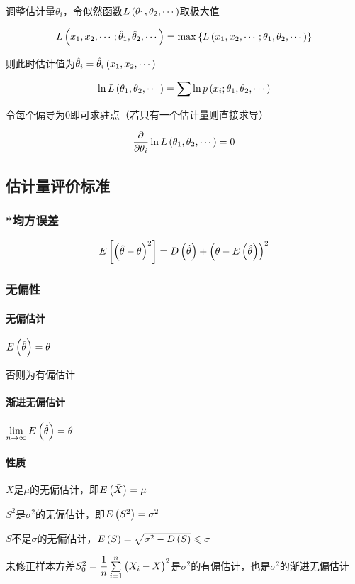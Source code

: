 \documentclass{article}
\begin{document}
调整估计量$\theta_i$，令似然函数$L\left(\theta_1,\theta_2,\cdots\right)$取极大值

\[L\left(x_1,x_2,\cdots;\hat\theta_1,\hat\theta_2,\cdots\right)=\max\left\{L\left(x_1,x_2,\cdots;\theta_1,\theta_2,\cdots\right)\right\}\]

则此时估计值为$\hat\theta_i=\hat\theta_i\left(x_1,x_2,\cdots\right)$

\[\ln L\left(\theta_1,\theta_2,\cdots\right)=\sum\ln p\left(x_i;\theta_1,\theta_2,\cdots\right)\]

令每个偏导为$0$即可求驻点（若只有一个估计量则直接求导）

\[\frac\partial{\partial\theta_i}\ln L\left(\theta_1,\theta_2,\cdots\right)=0\]

\subsection{估计量评价标准}

\subsubsection{*均方误差}

\[E\left[\left(\hat\theta-\theta\right)^2\right]=D\left(\hat\theta\right)+{\left(\theta-E\left(\hat\theta\right)\right)}^2\]

\subsubsection{无偏性}

\paragraph{无偏估计}$E\left(\hat\theta\right)=\theta$

否则为有偏估计

\paragraph{渐进无偏估计}$\lim\limits_{n\to\infty}E\left(\hat\theta\right)=\theta$

\paragraph{性质}

$\bar X$是$\mu$的无偏估计，即$E\left(\bar X\right)=\mu$

$S^2$是$\sigma^2$的无偏估计，即$E\left(S^2\right)=\sigma^2$

$S$不是$\sigma$的无偏估计，$E\left(S\right)=\sqrt{\sigma^2-D\left(S\right)}\leqslant\sigma$

未修正样本方差$S_0^2=\dfrac1n\sum\limits_{i=1}^n{\left(X_i-\bar X\right)}^2$是$\sigma^2$的有偏估计，也是$\sigma^2$的渐进无偏估计
\end{document}
